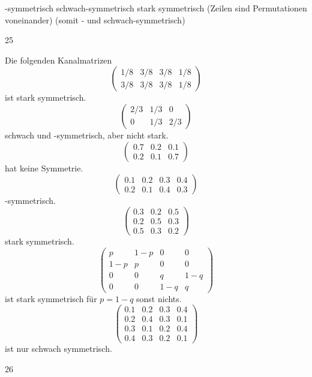\documentclass{article}
\begin{document}
-symmetrisch
schwach-symmetrisch
stark symmetrisch (Zeilen sind Permutationen voneinander) (somit - und schwach-symmetrisch)

25
\begin{exercise}
    Die folgenden Kanalmatrizen
    $$
    \begin{pmatrix}
        1/8 & 3/8 & 3/8 & 1/8\\
        3/8 & 3/8 & 3/8 & 1/8
    \end{pmatrix}
    $$
    ist stark symmetrisch.
    $$
    \begin{pmatrix}
        2/3 & 1/3 & 0\\
        0 & 1/3 & 2/3
    \end{pmatrix}
    $$
    schwach und -symmetrisch, aber nicht stark.
    $$
    \begin{pmatrix}
        0.7 & 0.2 & 0.1\\
        0.2 & 0.1 & 0.7
    \end{pmatrix}
    $$
    hat keine Symmetrie.
    $$
    \begin{pmatrix}
        0.1 & 0.2 & 0.3 & 0.4\\
        0.2 & 0.1 & 0.4 & 0.3
    \end{pmatrix}
    $$
    -symmetrisch.
    $$
    \begin{pmatrix}
        0.3 & 0.2 & 0.5\\
        0.2 & 0.5 & 0.3\\
        0.5 & 0.3 & 0.2
    \end{pmatrix}
    $$
    stark symmetrisch.
    $$
    \begin{pmatrix}
        p & 1-p & 0 & 0\\
        1-p & p & 0 & 0\\
        0 & 0 & q & 1-q\\
        0 & 0 & 1-q & q
    \end{pmatrix}
    $$
    ist stark symmetrisch für $p=1-q$ sonst nichts.
    $$
    \begin{pmatrix}
        0.1 & 0.2 & 0.3 & 0.4\\
        0.2 & 0.4 & 0.3 & 0.1\\
        0.3 & 0.1 & 0.2 & 0.4\\
        0.4 & 0.3 & 0.2 & 0.1
    \end{pmatrix}
    $$
    ist nur schwach symmetrisch.
\end{exercise}

26
\begin{exercise}
    
\end{exercise}
\end{document}

